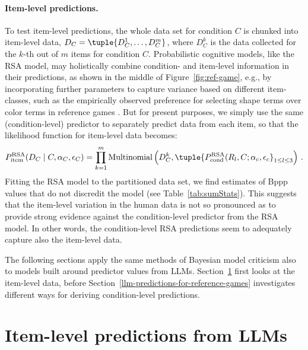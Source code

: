 \documentclass[fleqn]{article}
\begin{document}
\paragraph{Item-level predictions.}
To test item-level predictions, the whole data set for condition $C$ is chunked into item-level data, $D_{C} = \tuple{D^{1}_{C}, \dots, D^{m}_{C} }$, where $D_{C}^{k}$ is the data collected for the $k$-th out of $m$ items for condition $C$.
Probabilistic cognitive models, like the RSA model, may holistically combine condition- and item-level information in their predictions, as shown in the middle of Figure~\ref{fig:ref-game}, e.g., by incorporating further parameters to capture variance based on different item-classes, such as the empirically observed preference for selecting shape terms over color terms in reference games \citep[e.g.][]{QingFranke2013:Variations-on-a}.
But for present purposes, we simply use the same (condition-level) predictor to separately predict data from each item, so that the likelihood function for item-level data becomes:
%
\begin{align*}
 P^{\text{RSA}}_{\text{item}}(D_{C} \mid C, \alpha_{C}, \epsilon_{C}) = \prod_{k = 1}^{m} \text{Multinomial} \left (D_{C}^{k}, \tuple{P_{\text{cond}}^{\text{RSA}}(R_{l}, C; \alpha_{c}, \epsilon_{c}}_{1 \le l \le 3} \right )\,.
\end{align*}
%
Fitting the RSA model to the partitioned data set, we find estimates of Bppp values that do not discredit the model (see Table~\ref{tab:sumStats}).
This suggests that the item-level variation in the human data is not so pronounced as to provide strong evidence against the condition-level predictor from the RSA model.
In other words, the condition-level RSA predictions seem to adequately capture also the item-level data.

The following sections apply the same methods of Bayesian model criticism also to models built around predictor values from LLMs.
Section~\ref{sec:item-level-pred} first looks at the item-level data, before Section~\ref{llm-predictions-for-reference-games} investigates different ways for deriving condition-level predictions.

\section{Item-level predictions from LLMs}
\label{sec:item-level-pred}
\end{document}
